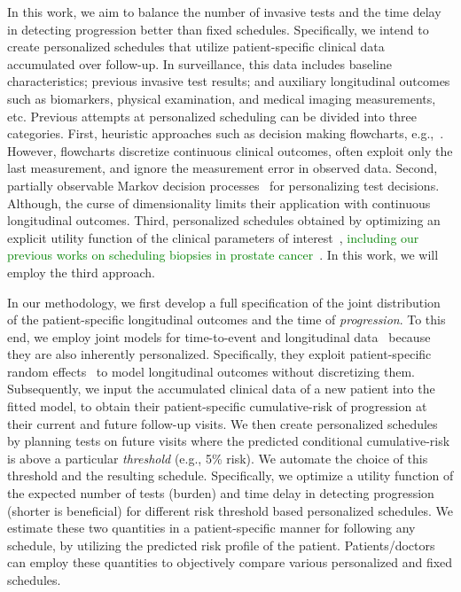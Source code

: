 In this work, we aim to balance the number of invasive tests and the time delay in detecting progression better than fixed schedules. Specifically, we intend to create personalized schedules that utilize patient-specific clinical data accumulated over follow-up. In surveillance, this data includes baseline characteristics; previous invasive test results; and auxiliary longitudinal outcomes such as biomarkers, physical examination, and medical imaging measurements, etc. Previous attempts at personalized scheduling can be divided into three categories. First, heuristic approaches such as decision making flowcharts, e.g.,~\citet{bokhorst2015compliance}. However, flowcharts discretize continuous clinical outcomes, often exploit only the last measurement, and ignore the measurement error in observed data. Second, partially observable Markov decision processes~\citep{alagoz2010operations, steimle2017markov} for personalizing test decisions. Although, the curse of dimensionality limits their application with continuous longitudinal outcomes. Third, personalized schedules obtained by optimizing an explicit utility function of the clinical parameters of interest~\citep{bebu2017optimal,rizopoulos2015personalized}, \textcolor{Green}{including our previous works on scheduling biopsies in prostate cancer~\citep{tomer2019personalized,tomer2020webapp}}. In this work, we will employ the third approach.

In our methodology, we first develop a full specification of the joint distribution of the patient-specific longitudinal outcomes and the time of \textit{progression}. To this end, we employ joint models for time-to-event and longitudinal data~\citep{tsiatis2004joint,rizopoulos2012joint} because they are also inherently personalized. Specifically, they exploit patient-specific random effects~\citep{mcculloch2005generalized} to model longitudinal outcomes without discretizing them. Subsequently, we input the accumulated clinical data of a new patient into the fitted model, to obtain their patient-specific cumulative-risk of progression at their current and future follow-up visits. We then create personalized schedules by planning tests on future visits where the predicted conditional cumulative-risk is above a particular \textit{threshold} (e.g., 5\% risk). We automate the choice of this threshold and the resulting schedule. Specifically, we optimize a utility function of the expected number of tests (burden) and time delay in detecting progression (shorter is beneficial) for different risk threshold based personalized schedules. We estimate these two quantities in a patient-specific manner for following any schedule, by utilizing the predicted risk profile of the patient. Patients/doctors can employ these quantities to objectively compare various personalized and fixed schedules.

